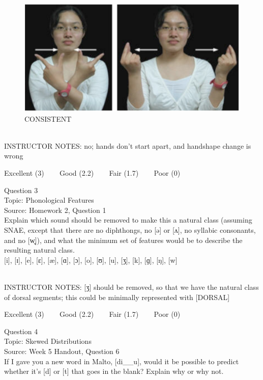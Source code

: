 \documentclass[12pt]{article}
\begin{document}
\begin{figure}[H]
\includegraphics{../images/taiwansign_consistent.png}
\caption{CONSISTENT}
\end{figure}

~\\
INSTRUCTOR NOTES: no; hands don't start apart, and handshape change is wrong


\vfill
Excellent (3) ~~~ Good (2.2) ~~~ Fair (1.7) ~~~ Poor (0)
\newpage

{\large Question 3}\\

Topic: Phonological Features\\
Source: Homework 2, Question 1\\

Explain which sound should be removed to make this a natural class (assuming SNAE, except that there are no diphthongs, no [ə] or [ʌ], no syllabic consonants, and no [w̥]), and what the minimum set of features would be to describe the resulting natural class.\\

{[i]}, {[ɪ]}, {[e]}, {[ɛ]}, {[æ]}, {[ɑ]}, {[ɔ]}, {[o]}, {[ʊ]}, {[u]}, {[ʒ]}, {[k]}, {[ɡ]}, {[ŋ]}, {[w]}


~\\
INSTRUCTOR NOTES: [ʒ] should be removed, so that we have the natural class of dorsal segments; this could be minimally represented with [DORSAL]


\vfill
Excellent (3) ~~~ Good (2.2) ~~~ Fair (1.7) ~~~ Poor (0)
\newpage

{\large Question 4}\\

Topic: Skewed Distributions\\
Source: Week 5 Handout, Question 6\\

If I gave you a new word in Malto, [di\_\_u], would it be possible to predict whether it's [d] or [t] that goes in the blank? Explain why or why not.\\
\end{document}

